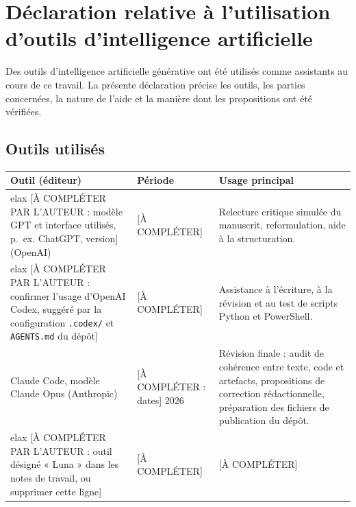 
\chapter*{Déclaration relative à l'utilisation d'outils d'intelligence artificielle}

Des outils d'intelligence artificielle générative ont été utilisés comme
assistants au cours de ce travail. La présente déclaration précise les outils,
les parties concernées, la nature de l'aide et la manière dont les
propositions ont été vérifiées.

\section*{Outils utilisés}

\begin{table}[H]
\centering
\small
\begin{tabularx}{\textwidth}{p{} p{} X}
\toprule
\textbf{Outil (éditeur)} & \textbf{Période} & \textbf{Usage principal} \\
\midrule

elax [À COMPLÉTER PAR L'AUTEUR : modèle GPT et interface utilisés, p.~ex. ChatGPT, version] (OpenAI) &
[À COMPLÉTER] &
Relecture critique simulée du manuscrit, reformulation, aide à la structuration. \\

elax [À COMPLÉTER PAR L'AUTEUR : confirmer l'usage d'OpenAI Codex, suggéré par la configuration \texttt{.codex/} et \texttt{AGENTS.md} du dépôt] &
[À COMPLÉTER] &
Assistance à l'écriture, à la révision et au test de scripts Python et PowerShell. \\
Claude Code, modèle Claude Opus (Anthropic) &
[À COMPLÉTER : dates] 2026 &
Révision finale : audit de cohérence entre texte, code et artefacts, propositions de correction rédactionnelle, préparation des fichiers de publication du dépôt. \\

elax [À COMPLÉTER PAR L'AUTEUR : outil désigné « Luna » dans les notes de travail, ou supprimer cette ligne] &
[À COMPLÉTER] &
[À COMPLÉTER] \\
\bottomrule
\end{tabularx}
\end{table}

